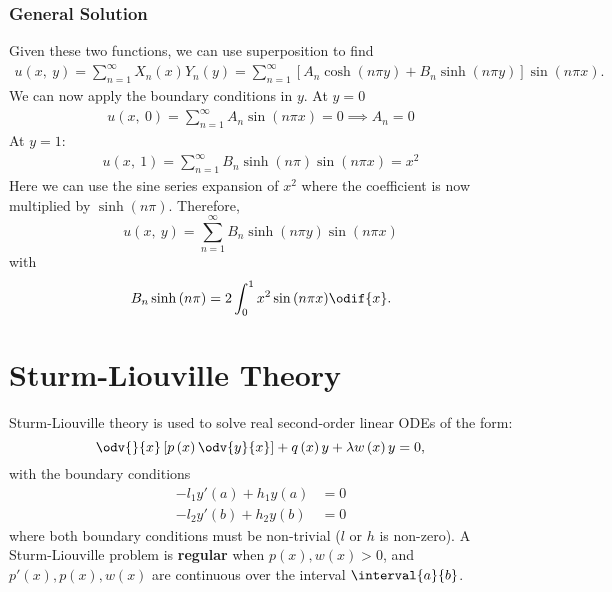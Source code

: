 \documentclass{article}
\begin{document}
\subsubsection{General Solution}
Given these two functions, we can use superposition to find
\begin{align*}
    u\left( x,\: y \right) = \sum_{n = 1}^\infty X_n\left( x \right) Y_n\left( y \right) = \sum_{n = 1}^\infty \left[ A_n \cosh{\left( n \pi y \right)} + B_n \sinh{\left( n \pi y \right)} \right] \sin{\left( n \pi x \right)}.
\end{align*}
We can now apply the boundary conditions in \(y\). At \(y = 0\)
\begin{align*}
    u\left( x,\: 0 \right) = \sum_{n = 1}^\infty A_n \sin{\left( n \pi x \right)} = 0 \implies A_n = 0
\end{align*}
At \(y = 1\):
\begin{align*}
    u\left( x,\: 1 \right) = \sum_{n = 1}^\infty B_n \sinh{\left( n \pi \right)} \sin{\left( n \pi x \right)} = x^2
\end{align*}
Here we can use the sine series expansion of \(x^2\) where the coefficient is now multiplied by \(\sinh{\left( n \pi \right)}\).
Therefore,
\begin{equation*}
    u\left( x,\: y \right) = \sum_{n = 1}^\infty B_n \sinh{\left( n \pi y \right)} \sin{\left( n \pi x \right)}
\end{equation*}
with
\begin{equation*}
    B_n \sinh{\left( n \pi \right)} = 2 \int_0^1 x^2 \sin{\left( n \pi x \right)} \odif{x}.
\end{equation*}
\section{Sturm-Liouville Theory}
Sturm-Liouville theory is used to solve real second-order linear ODEs of the form:
\begin{equation*}
    \odv{}{x} \left[ p\left( x \right) \odv{y}{x} \right] + q\left( x \right) y + \lambda w\left( x \right) y = 0,
\end{equation*}
with the boundary conditions
\begin{align*}
    -l_1 y'\left( a \right) + h_1 y\left( a \right) & = 0 \\
    -l_2 y'\left( b \right) + h_2 y\left( b \right) & = 0
\end{align*}
where both boundary conditions must be non-trivial (\(l\) or \(h\) is non-zero). A Sturm-Liouville problem is
\textbf{regular} when \(p\left( x \right), w\left( x \right) > 0\), and \(p'\left( x \right), p\left( x \right), w\left( x \right)\) are continuous
over the interval \(\interval{a}{b}\).
\end{document}
